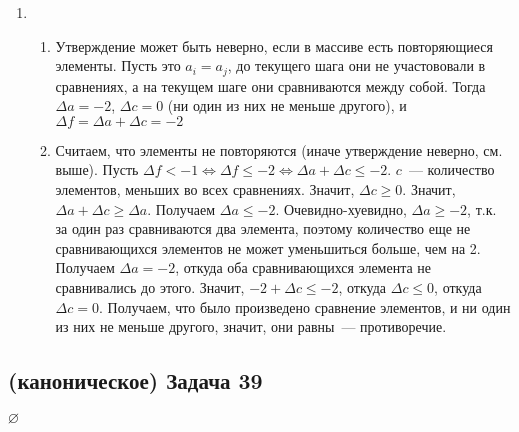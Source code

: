 \documentclass[a4paper]{article}
\newcommand{\NN}{\mathbb{N}}
\begin{document}
\begin{enumerate}
\begin{enumerate}
\end{enumerate}
\item \begin{enumerate}
\item Утверждение может быть неверно, если в массиве есть повторяющиеся элементы. Пусть это $a_i=a_j$, до текущего шага они не участововали в сравнениях, а на текущем шаге они сравниваются между собой. Тогда $\Delta a=-2$, $\Delta c=0$ (ни один из них не меньше другого), и $\Delta f=\Delta a+\Delta c=-2$
\item Считаем, что элементы не повторяются (иначе 
утверждение неверно, см. выше). Пусть $\Delta f< -1\Leftrightarrow \Delta f\leqslant -2\Leftrightarrow \Delta a+\Delta c\leqslant -2$. $c$~--- количество элементов, меньших во всех сравнениях. Значит, $\Delta c\geqslant 0$. Значит, $\Delta a + \Delta c\geqslant \Delta a$. Получаем $\Delta a\leqslant -2$. Очевидно-хуевидно, $\Delta a\geqslant -2$, т.к. за один раз сравниваются два элемента, поэтому количество еще не сравнивающихся элементов не может уменьшиться больше, чем на 2. Получаем $\Delta a=-2$, откуда оба сравнивающихся элемента не сравнивались до этого. Значит, $-2+\Delta c\leqslant -2$, откуда $\Delta c\leqslant 0$, откуда $\Delta c=0$. Получаем, что было произведено сравнение элементов, и ни один из них не меньше другого, значит, они равны~--- противоречие.
\end{enumerate}
\end{enumerate}
\subsection*{(каноническое) Задача 39}
$\varnothing$
\end{document}
